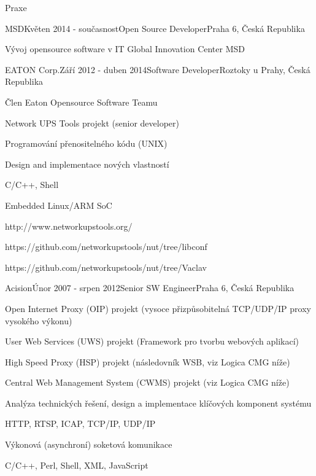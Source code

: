 \documentclass{resume} %
\begin{document}
\begin{rSection}{Praxe}

\begin{rSubsection}{MSD}{Kv\v{e}ten 2014 - sou\v{c}asnost}{Open Source Developer}{Praha 6, \v{C}esk\'{a} Republika}
\item V\'{y}voj opensource software v IT Global Innovation Center MSD
\end{rSubsection}


\begin{rSubsection}{EATON Corp.}{Z\'{a}\v{r}\'{i} 2012 - duben 2014}{Software Developer}{Roztoky u Prahy, \v{C}esk\'{a} Republika}
\item \v{C}len Eaton Opensource Software Teamu
\item Network UPS Tools projekt (senior developer)
\item Programov\'{a}n\'{i} p\v{r}enositeln\'{e}ho k\'{o}du (UNIX)
\item Design and implementace nov\'{y}ch vlastnost\'{i}
\item C/C++, Shell
\item Embedded Linux/ARM SoC
\item http://www.networkupstools.org/
\item https://github.com/networkupstools/nut/tree/libconf
\item https://github.com/networkupstools/nut/tree/Vaclav
\end{rSubsection}


\begin{rSubsection}{Acision}{\'{U}nor 2007 - srpen 2012}{Senior SW Engineer}{Praha 6, \v{C}esk\'{a} Republika}
\item Open Internet Proxy (OIP) projekt (vysoce p\v{r}izp\r{u}sobiteln\'{a} TCP/UDP/IP proxy vysok\'{e}ho v\'{y}konu)
\item User Web Services (UWS) projekt (Framework pro tvorbu webov\'{y}ch aplikac\'{i})
\item High Speed Proxy (HSP) projekt (n\'{a}sledovn\'{i}k WSB, viz Logica CMG n\'{i}\v{z}e)
\item Central Web Management System (CWMS) projekt (viz Logica CMG n\'{i}\v{z}e)
\item Anal\'{y}za technick\'{y}ch \v{r}e\v{s}en\'{i}, design a implementace kl\'{i}\v{c}ov\'{y}ch komponent syst\'{e}mu
\item HTTP, RTSP, ICAP, TCP/IP, UDP/IP
\item V\'{y}konov\'{a} (asynchron\'{i}) soketov\'{a} komunikace
\item C/C++, Perl, Shell, XML, JavaScript
\end{rSubsection}


\end{rSection}
\end{document}
